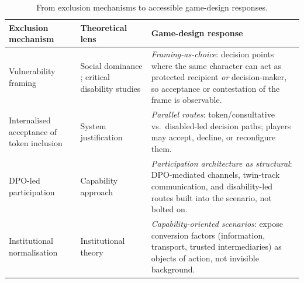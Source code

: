 \documentclass[sigconf]{acmart}
\begin{document}
\begin{table}[htbp]
\caption{From exclusion mechanisms to accessible game-design responses.}
\label{tab:bridge}
\small
\renewcommand{\arraystretch}{1.25}
\begin{tabular}{@{}p{}p{}p{}@{}}
\toprule
\textbf{Exclusion mechanism} & \textbf{Theoretical lens} & \textbf{Game-design response} \\
\midrule
Vulnerability framing &
Social dominance \cite{sidanius_pratto_1999_socdom}; critical disability
studies \cite{oliver_1990_politics} &
\emph{Framing-as-choice}: decision points where the same character can
act as protected recipient \emph{or} decision-maker, so acceptance or
contestation of the frame is observable. \\
\addlinespace
Internalised acceptance of token inclusion &
System justification \cite{jost_2003_decade} &
\emph{Parallel routes}: token/consultative vs.\ disabled-led decision
paths; players may accept, decline, or reconfigure them. \\
\addlinespace
DPO-led participation &
Capability approach \cite{sen_1999_development} &
\emph{Participation architecture as structural}: DPO-mediated channels,
twin-track communication, and disability-led routes built into the
scenario, not bolted on. \\
\addlinespace
Institutional normalisation &
Institutional theory \cite{dimaggio_powell_1983_ironcage} &
\emph{Capability-oriented scenarios}: expose conversion factors
(information, transport, trusted intermediaries) as objects of action,
not invisible background. \\
\bottomrule
\end{tabular}
\end{table}
\end{document}
